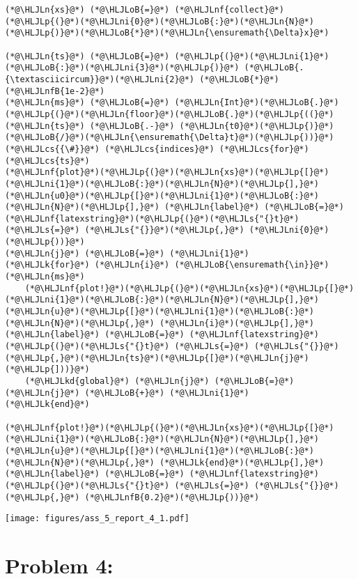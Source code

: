 \documentclass[12pt,a4paper]{article}
\newcommand{\HLJLk}[1]{\textcolor[RGB]{148,91,176}{\textbf{#1}}}
\newcommand{\HLJLkd}[1]{\textcolor[RGB]{214,102,97}{\textit{#1}}}
\newcommand{\HLJLn}[1]{#1}
\newcommand{\HLJLnf}[1]{\textcolor[RGB]{66,102,213}{#1}}
\newcommand{\HLJLs}[1]{\textcolor[RGB]{201,61,57}{#1}}
\newcommand{\HLJLnfB}[1]{\textcolor[RGB]{59,151,46}{#1}}
\newcommand{\HLJLni}[1]{\textcolor[RGB]{59,151,46}{#1}}
\newcommand{\HLJLoB}[1]{\textcolor[RGB]{102,102,102}{\textbf{#1}}}
\newcommand{\HLJLp}[1]{#1}
\newcommand{\HLJLcs}[1]{\textcolor[RGB]{153,153,119}{\textit{#1}}}
\begin{document}
\begin{lstlisting}
(*@\HLJLn{xs}@*) (*@\HLJLoB{=}@*) (*@\HLJLnf{collect}@*)(*@\HLJLp{(}@*)(*@\HLJLni{0}@*)(*@\HLJLoB{:}@*)(*@\HLJLn{N}@*)(*@\HLJLp{)}@*)(*@\HLJLoB{*}@*)(*@\HLJLn{\ensuremath{\Delta}x}@*)

(*@\HLJLn{ts}@*) (*@\HLJLoB{=}@*) (*@\HLJLp{(}@*)(*@\HLJLni{1}@*)(*@\HLJLoB{:}@*)(*@\HLJLni{3}@*)(*@\HLJLp{)}@*) (*@\HLJLoB{.{\textasciicircum}}@*)(*@\HLJLni{2}@*) (*@\HLJLoB{*}@*) (*@\HLJLnfB{1e-2}@*)
(*@\HLJLn{ms}@*) (*@\HLJLoB{=}@*) (*@\HLJLn{Int}@*)(*@\HLJLoB{.}@*)(*@\HLJLp{(}@*)(*@\HLJLn{floor}@*)(*@\HLJLoB{.}@*)(*@\HLJLp{((}@*)(*@\HLJLn{ts}@*) (*@\HLJLoB{.-}@*) (*@\HLJLn{t0}@*)(*@\HLJLp{)}@*)(*@\HLJLoB{/}@*)(*@\HLJLn{\ensuremath{\Delta}t}@*)(*@\HLJLp{))}@*)(*@\HLJLcs{{\#}}@*) (*@\HLJLcs{indices}@*) (*@\HLJLcs{for}@*) (*@\HLJLcs{ts}@*)
(*@\HLJLnf{plot}@*)(*@\HLJLp{(}@*)(*@\HLJLn{xs}@*)(*@\HLJLp{[}@*)(*@\HLJLni{1}@*)(*@\HLJLoB{:}@*)(*@\HLJLn{N}@*)(*@\HLJLp{],}@*) (*@\HLJLn{u0}@*)(*@\HLJLp{[}@*)(*@\HLJLni{1}@*)(*@\HLJLoB{:}@*)(*@\HLJLn{N}@*)(*@\HLJLp{],}@*) (*@\HLJLn{label}@*) (*@\HLJLoB{=}@*) (*@\HLJLnf{latexstring}@*)(*@\HLJLp{(}@*)(*@\HLJLs{"{}t}@*) (*@\HLJLs{=}@*) (*@\HLJLs{"{}}@*)(*@\HLJLp{,}@*) (*@\HLJLni{0}@*) (*@\HLJLp{))}@*)
(*@\HLJLn{j}@*) (*@\HLJLoB{=}@*) (*@\HLJLni{1}@*)
(*@\HLJLk{for}@*) (*@\HLJLn{i}@*) (*@\HLJLoB{\ensuremath{\in}}@*) (*@\HLJLn{ms}@*)
    (*@\HLJLnf{plot!}@*)(*@\HLJLp{(}@*)(*@\HLJLn{xs}@*)(*@\HLJLp{[}@*)(*@\HLJLni{1}@*)(*@\HLJLoB{:}@*)(*@\HLJLn{N}@*)(*@\HLJLp{],}@*) (*@\HLJLn{u}@*)(*@\HLJLp{[}@*)(*@\HLJLni{1}@*)(*@\HLJLoB{:}@*)(*@\HLJLn{N}@*)(*@\HLJLp{,}@*) (*@\HLJLn{i}@*)(*@\HLJLp{],}@*) (*@\HLJLn{label}@*) (*@\HLJLoB{=}@*) (*@\HLJLnf{latexstring}@*)(*@\HLJLp{(}@*)(*@\HLJLs{"{}t}@*) (*@\HLJLs{=}@*) (*@\HLJLs{"{}}@*)(*@\HLJLp{,}@*)(*@\HLJLn{ts}@*)(*@\HLJLp{[}@*)(*@\HLJLn{j}@*)(*@\HLJLp{]))}@*)
    (*@\HLJLkd{global}@*) (*@\HLJLn{j}@*) (*@\HLJLoB{=}@*) (*@\HLJLn{j}@*) (*@\HLJLoB{+}@*) (*@\HLJLni{1}@*)
(*@\HLJLk{end}@*)

(*@\HLJLnf{plot!}@*)(*@\HLJLp{(}@*)(*@\HLJLn{xs}@*)(*@\HLJLp{[}@*)(*@\HLJLni{1}@*)(*@\HLJLoB{:}@*)(*@\HLJLn{N}@*)(*@\HLJLp{],}@*) (*@\HLJLn{u}@*)(*@\HLJLp{[}@*)(*@\HLJLni{1}@*)(*@\HLJLoB{:}@*)(*@\HLJLn{N}@*)(*@\HLJLp{,}@*) (*@\HLJLk{end}@*)(*@\HLJLp{],}@*) (*@\HLJLn{label}@*) (*@\HLJLoB{=}@*) (*@\HLJLnf{latexstring}@*)(*@\HLJLp{(}@*)(*@\HLJLs{"{}t}@*) (*@\HLJLs{=}@*) (*@\HLJLs{"{}}@*)(*@\HLJLp{,}@*) (*@\HLJLnfB{0.2}@*)(*@\HLJLp{))}@*)
\end{lstlisting}

\texttt{[image: figures/ass\_5\_report\_4\_1.pdf]}

\section{Problem 4:}
\end{document}
